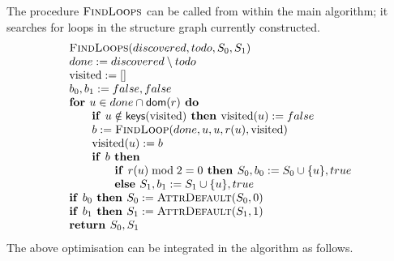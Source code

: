 \documentclass{article}
\newcommand{\If}{\text{\textbf{if }}}
\newcommand{\Do}{\text{\textbf{ do }}}
\newcommand{\Then}{\text{\textbf{ then }}}
\newcommand{\Return}{\text{\textbf{return }}}
\begin{document}
The procedure $\textsc{FindLoops}$ can be called from within the main algorithm; it searches for loops in the structure graph currently constructed.
\begin{equation*}
\begin{array}{l}
\text{\textsc{FindLoops}}(discovered, todo, S_0, S_1)\\  %
done := discovered \setminus todo \\
\text{visited} := [] \\
b_0,b_1 := false,false \\
\textbf{for } u \in done \cap \textsf{dom}(r) \Do \\
\qquad \If u \notin \textsf{keys}(\text{visited}) \Then \text{visited}(u) := false\\
\qquad b := \textsc{FindLoop}(done, u, u, r(u), \text{visited}) \\
\qquad \text{visited}(u) := b\\
\qquad \If b \Then \\
\qquad \qquad \If r(u) \bmod 2 = 0 \Then S_0,b_0 := S_0 \cup \{u\}, true\\
\qquad\qquad \textbf{else } S_1,b_1 := S_1 \cup \{u\}, true\\
\If b_0 \Then S_0 := \textsc{AttrDefault}(S_0, 0)\\ 
\If b_1 \Then S_1 := \textsc{AttrDefault}(S_1, 1)\\ 
\Return S_0, S_1
\end{array}
\end{equation*}
The above optimisation can be integrated in the algorithm as follows.
\end{document}
